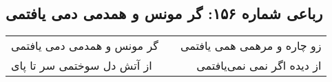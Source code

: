 \begin{center}
\section*{رباعی شماره ۱۵۶: گر مونس و همدمی دمی یافتمی}
\label{sec:156}
\begin{longtable}{l p{0.5cm} r}
گر مونس و همدمی دمی یافتمی
&&
زو چاره و مرهمی همی یافتمی
\\
از آتش دل سوختمی سر تا پای
&&
از دیده اگر نمی نمی‌یافتمی
\\
\end{longtable}
\end{center}
